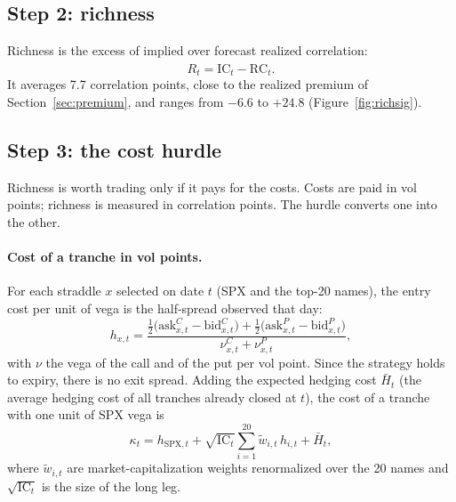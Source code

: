 \subsection{Step 2: richness}

Richness is the excess of implied over forecast realized correlation:
\begin{equation}\label{eq:rich}
  R_t = \mathrm{IC}_t - \widehat{\mathrm{RC}}_t .
\end{equation}
It averages 7.7 correlation points, close to the realized premium of Section~\ref{sec:premium}, and ranges from $-6.6$ to $+24.8$ (Figure~\ref{fig:richsig}).

\subsection{Step 3: the cost hurdle}

Richness is worth trading only if it pays for the costs. Costs are paid in vol points; richness is measured in correlation points. The hurdle converts one into the other.

\paragraph{Cost of a tranche in vol points.} For each straddle $x$ selected on date $t$ (SPX and the top-20 names), the entry cost per unit of vega is the half-spread observed that day:
\begin{equation}\label{eq:hs}
  h_{x,t} = \frac{\tfrac12\bigl(\mathrm{ask}^{C}_{x,t} - \mathrm{bid}^{C}_{x,t}\bigr) + \tfrac12\bigl(\mathrm{ask}^{P}_{x,t} - \mathrm{bid}^{P}_{x,t}\bigr)}{\nu^{C}_{x,t} + \nu^{P}_{x,t}} ,
\end{equation}
with $\nu$ the vega of the call and of the put per vol point. Since the strategy holds to expiry, there is no exit spread. Adding the expected hedging cost $\bar H_t$ (the average hedging cost of all tranches already closed at $t$), the cost of a tranche with one unit of SPX vega is
\begin{equation}\label{eq:costt}
  \kappa_t = h_{\mathrm{SPX},t} + \sqrt{\mathrm{IC}_t}\sum_{i=1}^{20}\tilde w_{i,t}\, h_{i,t} + \bar H_t ,
\end{equation}
where $\tilde w_{i,t}$ are market-capitalization weights renormalized over the 20 names and $\sqrt{\mathrm{IC}_t}$ is the size of the long leg.

